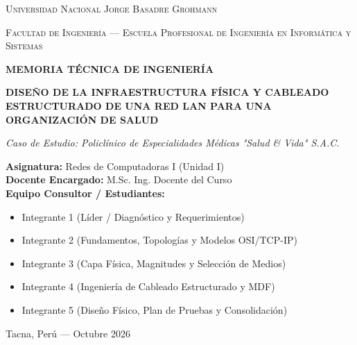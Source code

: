\documentclass[11pt,a4paper]{article}
\begin{document}
\begin{titlepage}
    \centering
    {\scshape\Large Universidad Nacional Jorge Basadre Grohmann \par}
    \vspace{0.3cm}
    {\scshape\large Facultad de Ingeniería --- Escuela Profesional de Ingeniería en Informática y Sistemas \par}
    \vspace{2.5cm}
    
    {\large\textbf{MEMORIA TÉCNICA DE INGENIERÍA}\par}
    \vspace{0.8cm}
    {\color{darkblue}\LARGE\bfseries DISEÑO DE LA INFRAESTRUCTURA FÍSICA Y CABLEADO ESTRUCTURADO DE UNA RED LAN PARA UNA ORGANIZACIÓN DE SALUD\par}
    \vspace{0.5cm}
    {\large\itshape Caso de Estudio: Policlínico de Especialidades Médicas "Salud \& Vida" S.A.C.\par}
    \vspace{2.5cm}
    
    \begin{flushleft}
        \textbf{Asignatura:} Redes de Computadoras I (Unidad I) \\
        \textbf{Docente Encargado:} M.Sc. Ing. Docente del Curso \\
        \textbf{Equipo Consultor / Estudiantes:}
        \begin{itemize}[leftmargin=1.5cm, noitemsep]
            \item Integrante 1 (Líder / Diagnóstico y Requerimientos)
            \item Integrante 2 (Fundamentos, Topologías y Modelos OSI/TCP-IP)
            \item Integrante 3 (Capa Física, Magnitudes y Selección de Medios)
            \item Integrante 4 (Ingeniería de Cableado Estructurado y MDF)
            \item Integrante 5 (Diseño Físico, Plan de Pruebas y Consolidación)
        \end{itemize}
    \end{flushleft}
    
    \vfill
    {\large Tacna, Perú --- Octubre 2026 \par}
\end{titlepage}
\end{document}
